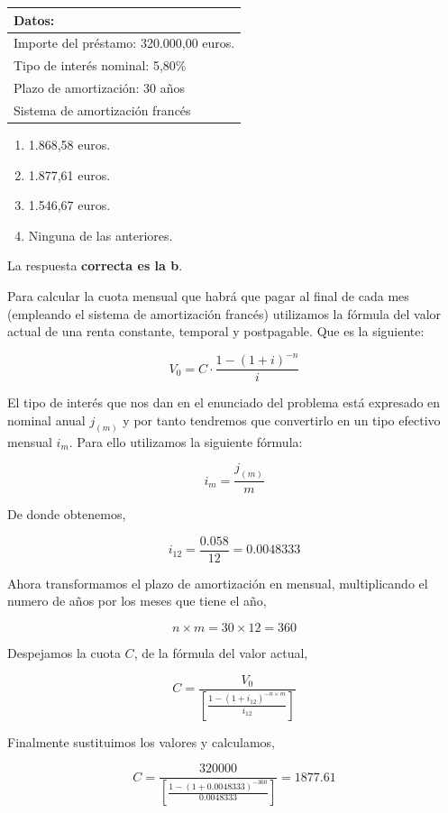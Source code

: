 \documentclass[
  letterpaper,
  DIV=11,
  numbers=noendperiod]{scrreprt}
\begin{document}
\begin{longtable}[]{@{}l@{}}
\toprule()
\textbf{Datos:} \\
\midrule()
\endhead
Importe del préstamo: 320.000,00 euros. \\
Tipo de interés nominal: 5,80\% \\
Plazo de amortización: 30 años \\
Sistema de amortización francés \\
\bottomrule()
\end{longtable}

\begin{enumerate}
\def\labelenumi{\alph{enumi})}
\item
  1.868,58 euros.
\item
  1.877,61 euros.
\item
  1.546,67 euros.
\item
  Ninguna de las anteriores.
\end{enumerate}

\begin{tcolorbox}[enhanced jigsaw, left=2mm, opacityback=0, colback=white, breakable, arc=.35mm, bottomrule=.15mm, rightrule=.15mm, toprule=.15mm, leftrule=.75mm, colframe=quarto-callout-tip-color-frame]
\begin{minipage}[t]{5.5mm}
\textcolor{quarto-callout-tip-color}{\faLightbulb}
\end{minipage}%
\begin{minipage}[t]{\textwidth - 5.5mm}

La respuesta \textbf{correcta es la b}.

Para calcular la cuota mensual que habrá que pagar al final de cada mes
(empleando el sistema de amortización francés) utilizamos la fórmula del
valor actual de una renta constante, temporal y postpagable. Que es la
siguiente:

\[ { V }_{ 0 }= C\cdot \frac { 1-{ (1+i) }^{ - n } }{ i } \]

El tipo de interés que nos dan en el enunciado del problema está
expresado en nominal anual \(j _{(m)}\) y por tanto tendremos que
convertirlo en un tipo efectivo mensual \(i_m\). Para ello utilizamos la
siguiente fórmula:

\[i_m=\frac{j _{(m)}}{m}\]

De donde obtenemos,

\[i_{12}=\frac{0.058}{12}=0.0048333\]

Ahora transformamos el plazo de amortización en mensual, multiplicando
el numero de años por los meses que tiene el año,

\[n\times m=30\times 12=360\]

Despejamos la cuota \(C\), de la fórmula del valor actual,

\[C=\frac { { V }_{ 0 } }{ \left[ \frac { 1-{ (1+i _{12}) }^{ - n\times m } }{ i _{12} }  \right]  } \]

Finalmente sustituimos los valores y calculamos,

\[C=\frac { 320000 }{ \left[ \frac { 1-{ (1+0.0048333) }^{ -360 } }{ 0.0048333 }  \right]  } = 1877.61\]

\end{minipage}%
\end{tcolorbox}
\end{document}
